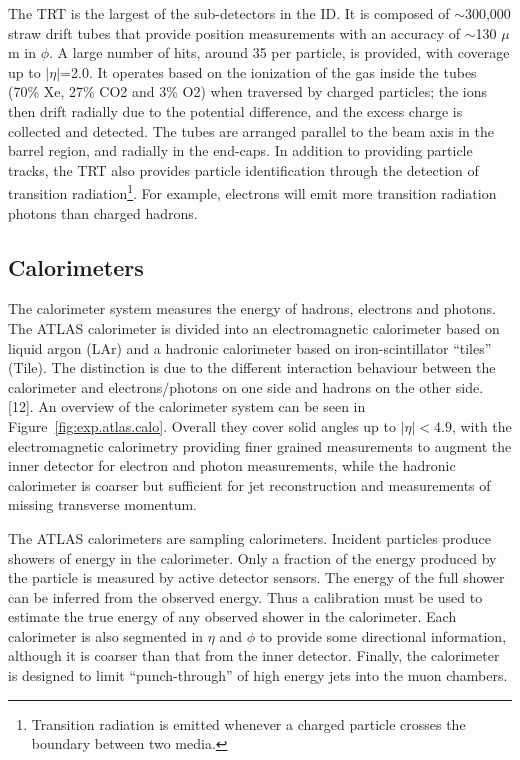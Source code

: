 The TRT is the largest of the sub-detectors in the ID.
It is composed of  $\sim$300,000 straw drift tubes 
that provide position measurements with an accuracy of $\sim$130 $\mu$m in $\phi$.
A large number of hits, around 35 per particle, is provided, with coverage up to
$|\eta|$=2.0. 
It operates based on the ionization of the gas inside the tubes (70\% Xe, 27\% CO2 and 3\% O2) 
when traversed by charged particles; the ions then drift radially due to
the potential difference, and the excess charge is collected and detected. 
The tubes are arranged parallel to the beam axis in the barrel region, and radially in the end-caps. 
In addition to providing particle tracks, 
the TRT also provides particle identification through
the detection of transition radiation\footnote{Transition radiation is emitted whenever a charged particle 
crosses the boundary between two media.}. For example, 
electrons will emit more transition radiation photons than charged hadrons.


\subsection{Calorimeters}


The calorimeter system measures the energy of hadrons, electrons and photons.
The ATLAS calorimeter is divided into an electromagnetic calorimeter based on liquid argon (LAr)
and a hadronic calorimeter based on  iron-scintillator ``tiles'' (Tile).
The distinction is due to the
different interaction behaviour between the calorimeter and electrons/photons on one side and hadrons on the other side. 
 [12].
An overview of the calorimeter system can be seen in Figure~\ref{fig:exp.atlas.calo}. 
Overall they cover solid angles up to $|\eta| < 4.9$, with the electromagnetic calorimetry providing finer 
grained measurements to augment the inner detector for electron and photon measurements, while
the hadronic calorimeter is coarser but sufficient for jet reconstruction and measurements
of missing transverse momentum.

The ATLAS calorimeters are sampling calorimeters. 
Incident particles produce showers of energy in the calorimeter. 
Only a fraction of the energy produced by the particle is
measured by active detector sensors. 
The energy of the full shower can be inferred from the observed
energy. Thus a calibration must be used to estimate the true energy
of any observed shower in the calorimeter. Each calorimeter is also segmented in $\eta$ and
$\phi$  to provide some directional information, although it is coarser than that from
the inner detector. Finally, the calorimeter is designed to limit ``punch-through'' of high
energy jets into the muon chambers.

